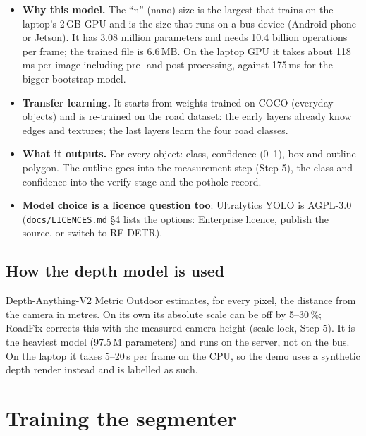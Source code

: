\documentclass[11pt,a4paper]{article}
\newcommand{\code}[1]{\texttt{\small #1}}
\begin{document}
\begin{itemize}
  \item \textbf{Why this model.} The ``n'' (nano) size is the largest that trains on the laptop's 2\,GB GPU and is the
        size that runs on a bus device (Android phone or Jetson). It has 3.08 million parameters and needs 10.4 billion
        operations per frame; the trained file is 6.6\,MB. On the laptop GPU it takes about 118\,ms per image
        including pre- and post-processing, against 175\,ms for the bigger bootstrap model.
  \item \textbf{Transfer learning.} It starts from weights trained on COCO (everyday objects) and is re-trained on the
        road dataset: the early layers already know edges and textures; the last layers learn the four road classes.
  \item \textbf{What it outputs.} For every object: class, confidence (0--1), box and outline polygon. The outline goes
        into the measurement step (Step 5), the class and confidence into the verify stage and the pothole record.
  \item \textbf{Model choice is a licence question too}: Ultralytics YOLO is AGPL-3.0 (\code{docs/LICENCES.md} \S4
        lists the options: Enterprise licence, publish the source, or switch to RF-DETR).
\end{itemize}

\subsection{How the depth model is used}
Depth-Anything-V2 Metric Outdoor estimates, for every pixel, the distance from the camera in metres. On its own its
absolute scale can be off by 5--30\,\%; RoadFix corrects this with the measured camera height (scale lock, Step 5).
It is the heaviest model (97.5\,M parameters) and runs on the server, not on the bus. On the laptop it takes
5--20\,s per frame on the CPU, so the demo uses a synthetic depth render instead and is labelled as such.

\section{Training the segmenter}\label{sec:training}
\end{document}
